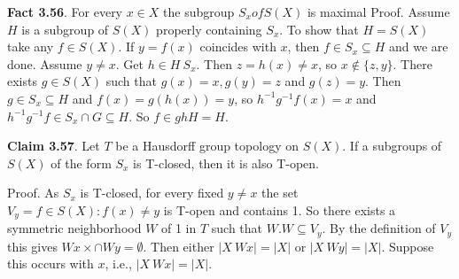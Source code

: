 \documentclass[12pt]{article}
\begin{document}
    \textbf{Fact 3.56}. For every $x \in X$ the subgroup $S_x of S(X)$ is maximal
        Proof. Assume $H$ is a subgroup of $S(X)$ properly containing $S_x$. To show that $H = S(X)$ take any $f \in S(X)$.
    If $y = f(x)$ coincides with $x$, then $f \in S_x \subseteq H$ and we are done. Assume $y \neq x$. Get $h \in H \ S_x$. Then
    $z = h(x) \neq x$, so $x \notin \{z, y\}$. There exists $g \in S(X)$ such that $g(x) = x, g(y) = z$ and $g(z) = y$. Then
    $g \in S_x \subseteq H$ and $f(x) = g(h(x)) = y$, so $h^{-1} g^{-1}f(x) = x$ and $h^{-1} g^{-1}f \in S_x \cap G \subseteq H$. So $f \in ghH = H$.

    \textbf{Claim 3.57}. Let $T$ be a Hausdorff group topology on $S(X)$. If a subgroups of $S(X)$ of the form $S_x$ is T-closed,
    then it is also T-open.


        Proof. As $S_x$ is T-closed, for every fixed $y \neq x$ the set $V_y = {f \in S(X) : f(x) \neq y}$ is T-open and contains 1.
    So there exists a symmetric neighborhood $W$ of 1 in $T$ such that $W.W \subseteq V_y$. By the definition of $V_y$ this gives
    $W x \times \cap W y = \emptyset$. Then either $|X \ Wx| = |X|$ or $|X \ W y| = |X|$. Suppose this occurs with $x$, i.e., $|X \ W x| = |X|$.

    
\end{document}

